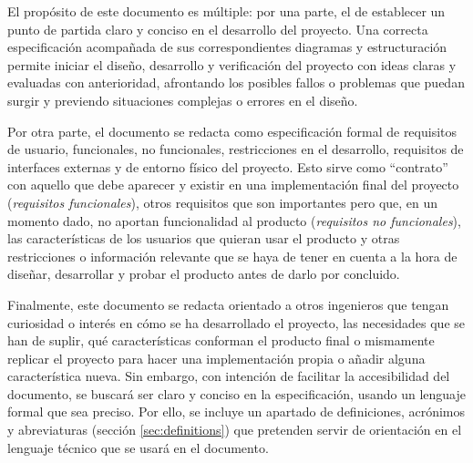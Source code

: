 El propósito de este documento es múltiple: por una parte, el de establecer
un punto de partida claro y conciso en el desarrollo del proyecto. Una correcta
especificación acompañada de sus correspondientes diagramas y estructuración
permite iniciar el diseño, desarrollo y verificación del proyecto con ideas
claras y evaluadas con anterioridad, afrontando los posibles fallos o problemas
que puedan surgir y previendo situaciones complejas o errores en el diseño.

Por otra parte, el documento se redacta como especificación formal de
requisitos de usuario, funcionales, no funcionales, restricciones en el
desarrollo, requisitos de interfaces externas y de entorno físico del proyecto.
Esto sirve como ``contrato'' con aquello que debe aparecer y existir en
una implementación final del proyecto (\textit{requisitos funcionales}),
otros requisitos que son importantes pero que, en un momento dado, no aportan
funcionalidad al producto (\textit{requisitos no funcionales}), las
características de los usuarios que quieran usar el producto y otras restricciones
o información relevante que se haya de tener en cuenta a la hora de diseñar, 
desarrollar y probar el producto antes de darlo por concluido.

Finalmente, este documento se redacta orientado a otros ingenieros que
tengan curiosidad o interés en cómo se ha desarrollado el proyecto, las necesidades
que se han de suplir, qué características conforman el producto final o mismamente
replicar el proyecto para hacer una implementación propia o añadir alguna 
característica nueva. Sin embargo, con intención de facilitar la accesibilidad del
documento, se buscará ser claro y conciso en la especificación, usando un
lenguaje formal que sea preciso. Por ello, se incluye un apartado de definiciones,
acrónimos y abreviaturas (sección \ref{sec:definitions}) que pretenden servir
de orientación en el lenguaje técnico que se usará en el documento.